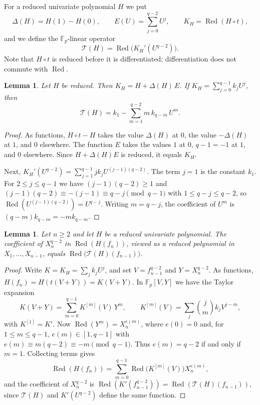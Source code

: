 \documentclass[11pt]{amsart}
\newtheorem{lemma}[theorem]{Lemma}
\theoremstyle{definition}
\theoremstyle{remark}
\newcommand{\F}{\mathbb{F}}
\newcommand{\Red}{\operatorname{Red}}
\newcommand{\cT}{\mathcal{T}}
\begin{document}
For a reduced univariate polynomial $H$ we put
\[
\Delta(H)=H(1)-H(0),\qquad E(U)=\sum_{j=0}^{q-2}U^j,\qquad K_H=\Red(H\circ t),
\]
and we define the $\F_p$-linear operator
\[
\cT(H)=\Red\bigl(K_H'(U^{q-2})\bigr).
\]
Note that $H\circ t$ is reduced before it is differentiated; differentiation does not commute with $\Red$.

\begin{lemma}\label{lem:operator}
Let $H$ be reduced. Then $K_H=H+\Delta(H)\,E$. If $K_H=\sum_{j=0}^{q-1}k_jU^j$, then
\[
\cT(H)=k_1-\sum_{m=1}^{q-2}m\,k_{q-m}\,U^m.
\]
\end{lemma}

\begin{proof}
As functions, $H\circ t-H$ takes the value $\Delta(H)$ at $0$, the value $-\Delta(H)$ at $1$, and $0$ elsewhere. The function $E$ takes the values $1$ at $0$, $q-1=-1$ at $1$, and $0$ elsewhere. Since $H+\Delta(H)E$ is reduced, it equals $K_H$.

Next, $K_H'(U^{q-2})=\sum_{j=1}^{q-1}jk_jU^{(j-1)(q-2)}$. The term $j=1$ is the constant $k_1$. For $2\le j\le q-1$ we have $(j-1)(q-2)\ge1$ and $(j-1)(q-2)\equiv-(j-1)\equiv q-j\pmod{q-1}$ with $1\le q-j\le q-2$, so $\Red(U^{(j-1)(q-2)})=U^{q-j}$. Writing $m=q-j$, the coefficient of $U^m$ is $(q-m)k_{q-m}=-mk_{q-m}$.
\end{proof}

\begin{lemma}\label{lem:extract}
Let $n\ge2$ and let $H$ be a reduced univariate polynomial. The coefficient of $X_n^{q-2}$ in $\Red(H(f_n))$, viewed as a reduced polynomial in $X_1,\dots,X_{n-1}$, equals $\Red\bigl(\cT(H)(f_{n-1})\bigr)$.
\end{lemma}

\begin{proof}
Write $K=K_H=\sum_jk_jU^j$, and set $V=f_{n-1}^{q-2}$ and $Y=X_n^{q-2}$. As functions, $H(f_n)=H(t(V+Y))=K(V+Y)$. In $\F_p[V,Y]$ we have the Taylor expansion
\[
K(V+Y)=\sum_{m=0}^{q-1}K^{[m]}(V)\,Y^m,\qquad K^{[m]}(V)=\sum_{j}\binom{j}{m}k_jV^{j-m},
\]
with $K^{[1]}=K'$. Now $\Red(Y^m)=X_n^{e(m)}$, where $e(0)=0$ and, for $1\le m\le q-1$, $e(m)\in[1,q-1]$ with $e(m)\equiv m(q-2)\equiv-m\pmod{q-1}$. Thus $e(m)=q-2$ if and only if $m=1$. Collecting terms gives
\[
\Red(H(f_n))=\sum_{m=0}^{q-1}\Red\bigl(K^{[m]}(V)\bigr)X_n^{e(m)},
\]
and the coefficient of $X_n^{q-2}$ is $\Red(K'(f_{n-1}^{q-2}))=\Red(\cT(H)(f_{n-1}))$, since $\cT(H)$ and $K'(U^{q-2})$ define the same function.
\end{proof}
\end{document}

